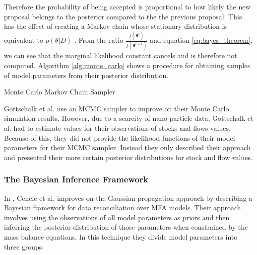 \documentclass[ %
                    author={Tom Jager},
                supervisor={Dr. Daniel Schien},
                    degree={MEng},
                     title={A Bayesian Inference Engine for Calibrating Uncertainty over UMIS Structured MFA Systems},
                  subtitle={},
                      type={research},
                      year={2019} ]{dissertation}
\begin{document}
Therefore the probability of being accepted is proportional to how likely the new proposal belongs to the posterior compared to the the previous proposal. This has the effect of creating a Markov chain whose stationary distribution is equivalent to $p(\theta | D)$ \cite{green2015bayesian}. From the ratio $\frac{f(\bm{\theta}^i)}{f(\bm{\theta}^{i-1})}$ and equation \ref{eq:bayes_theorem}, we can see that the marginal likelihood constant cancels and is therefore not computed. Algorithm \ref{alg:monte_carlo} shows a procedure for obtaining samples of model parameters from their posterior distribution.

\begin{algorithm}[]
    \caption{Monte Carlo Markov Chain Sampler}
    \label{alg:monte_carlo}
\end{algorithm}

Gottschalk et al. use an MCMC sampler to improve on their Monte Carlo simulation results. However, due to a scarcity of nano-particle data, Gottschalk et al. had to estimate values for their observations of stocks and flows values. Because of this, they did not provide the likelihood functions of their model parameters for their MCMC sampler. Instead they only described their approach and presented their more certain posterior distributions for stock and flow values.

\subsubsection{The Bayesian Inference Framework}

In \cite{cencic2018data, cencic2015general}, Cencic et al. improves on the Gaussian propagation approach by describing a Bayesian framework for data reconciliation over MFA models. Their approach involves using the observations of all model parameters as priors and then inferring the posterior distribution of those parameters when constrained by the mass balance equations. In this technique they divide model parameters into three groups:
\end{document}
